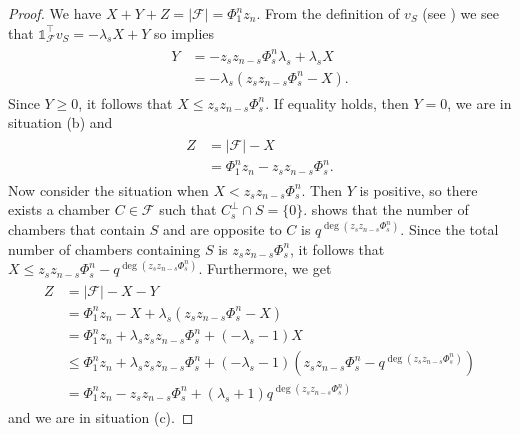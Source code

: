 \documentclass[11pt]{article}
\newcommand{\charvec}{\mathds{1}}
\newcommand{\EKR}{\mathcal{F}}
\renewcommand{\le}{\leqslant}
\renewcommand{\ge}{\geqslant}
\begin{document}
\begin{proof}
We have $X+Y+Z=|\EKR|=\Phi_1^nz_n$. From the definition of $v_S$ (see ) 
we see that $\charvec_\EKR^\top v_S=-\lambda_s X+Y$ so  implies 
\begin{align*}
	\begin{split}
		Y&=-z_sz_{n-s} \Phi_s^n \lambda_s + \lambda_s X\\
		&=-\lambda_s (z_sz_{n-s} \Phi_s^n -X).
	\end{split}
\end{align*}
Since $Y\ge 0$, it follows that $X\le z_sz_{n-s}\Phi_s^n$. If equality holds, then $Y=0$, we are in situation (b) and
\begin{align*}
	\begin{split}
		Z&= |\EKR|-X\\
		&= \Phi_1^n z_n- z_sz_{n-s}\Phi_s^n.
	\end{split}
\end{align*} 
Now consider the situation when $X<z_sz_{n-s}\Phi_s^n$. Then $Y$ is positive, so there exists a chamber $C\in \EKR$ such that $C_s^\perp \cap S=\{ 0\}$. 
 shows that the number of chambers that contain $S$ and are opposite to $C$ is $q^{\deg(z_sz_{n-s} \Phi_s^n)}$. Since the total number of chambers containing $S$ is $z_sz_{n-s}\Phi_s^n$, it follows that $X\le z_sz_{n-s}\Phi_s^n-q^{\deg(z_sz_{n-s} \Phi_s^n)}$. 
	Furthermore, we get
	\begin{align*}
		\begin{split}
			Z&=|\EKR|-X-Y\\
			&=\Phi_1^nz_n-X+ \lambda_s (z_sz_{n-s} \Phi_s^n -X)\\
			&=\Phi_1^nz_n+\lambda_s z_sz_{n-s}\Phi_s^n + (-\lambda_s -1)X\\
                 &\le \Phi_1^nz_n+\lambda_s z_sz_{n-s}\Phi_s^n + (-\lambda_s -1)(z_sz_{n-s}\Phi_s^n-q^{\deg(z_sz_{n-s} \Phi_s^n)})\\
                 &= \Phi_1^nz_n -z_sz_{n-s}\Phi_s^n+ (\lambda_s+1) q^{\deg(z_sz_{n-s} \Phi_s^n)} 
		\end{split}
	\end{align*}
	and we are in situation (c).
\end{proof}
\end{document}
